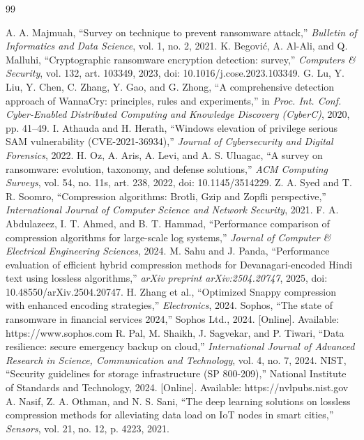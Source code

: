 \documentclass{iaesarticle}
\begin{document}
\begin{thebibliography}{99}
\footnotesize
\itemsep 0pt

 A. A. Majmuah, ``Survey on technique to prevent ransomware attack,'' \textsl{Bulletin of Informatics and Data Science}, vol. 1, no. 2, 2021.
 K. Begovi\'c, A. Al-Ali, and Q. Malluhi, ``Cryptographic ransomware encryption detection: survey,'' \textsl{Computers \& Security}, vol. 132, art. 103349, 2023, doi: 10.1016/j.cose.2023.103349.
 G. Lu, Y. Liu, Y. Chen, C. Zhang, Y. Gao, and G. Zhong, ``A comprehensive detection approach of WannaCry: principles, rules and experiments,'' in \textsl{Proc. Int. Conf. Cyber-Enabled Distributed Computing and Knowledge Discovery (CyberC)}, 2020, pp. 41--49.
 I. Athauda and H. Herath, ``Windows elevation of privilege serious SAM vulnerability (CVE-2021-36934),'' \textsl{Journal of Cybersecurity and Digital Forensics}, 2022.
 H. Oz, A. Aris, A. Levi, and A. S. Uluagac, ``A survey on ransomware: evolution, taxonomy, and defense solutions,'' \textsl{ACM Computing Surveys}, vol. 54, no. 11s, art. 238, 2022, doi: 10.1145/3514229.
 Z. A. Syed and T. R. Soomro, ``Compression algorithms: Brotli, Gzip and Zopfli perspective,'' \textsl{International Journal of Computer Science and Network Security}, 2021.
 F. A. Abdulazeez, I. T. Ahmed, and B. T. Hammad, ``Performance comparison of compression algorithms for large-scale log systems,'' \textsl{Journal of Computer \& Electrical Engineering Sciences}, 2024.
 M. Sahu and J. Panda, ``Performance evaluation of efficient hybrid compression methods for Devanagari-encoded Hindi text using lossless algorithms,'' \textsl{arXiv preprint arXiv:2504.20747}, 2025, doi: 10.48550/arXiv.2504.20747.
 H. Zhang et al., ``Optimized Snappy compression with enhanced encoding strategies,'' \textsl{Electronics}, 2024.
 Sophos, ``The state of ransomware in financial services 2024,'' Sophos Ltd., 2024. [Online]. Available: https://www.sophos.com
 R. Pal, M. Shaikh, J. Sagvekar, and P. Tiwari, ``Data resilience: secure emergency backup on cloud,'' \textsl{International Journal of Advanced Research in Science, Communication and Technology}, vol. 4, no. 7, 2024.
 NIST, ``Security guidelines for storage infrastructure (SP 800-209),'' National Institute of Standards and Technology, 2024. [Online]. Available: https://nvlpubs.nist.gov
 A. Nasif, Z. A. Othman, and N. S. Sani, ``The deep learning solutions on lossless compression methods for alleviating data load on IoT nodes in smart cities,'' \textsl{Sensors}, vol. 21, no. 12, p. 4223, 2021.

\end{thebibliography}
\end{document}

